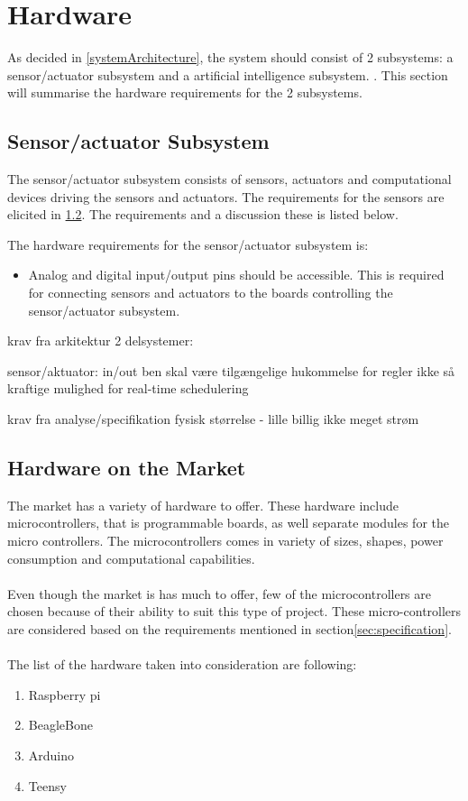 \section{Hardware}
As decided in \cref{systemArchitecture}, the system should consist of 2 subsystems: a sensor/actuator subsystem and a artificial intelligence subsystem. . This section will summarise the hardware requirements for the 2 subsystems.

\subsection{Sensor/actuator Subsystem}
The sensor/actuator subsystem consists of sensors, actuators and computational devices driving the sensors and actuators. The requirements for the sensors are elicited in \cref{}. The requirements and a discussion these is listed below.

The hardware requirements for the sensor/actuator subsystem is:

\begin{itemize}
\item Analog and digital input/output pins should be accessible. This is required for connecting sensors and actuators to the boards controlling the sensor/actuator subsystem.
\end{itemize}

krav fra arkitektur
2 delsystemer:

sensor/aktuator:
in/out ben skal være tilgængelige
hukommelse for regler
ikke så kraftige
mulighed for real-time schedulering

krav fra analyse/specifikation
fysisk størrelse - lille
billig
ikke meget strøm





\subsection{Hardware on the Market}
The market has a variety of hardware to offer. These hardware include microcontrollers, that is programmable boards, as well separate modules for the micro controllers. The microcontrollers comes in variety of sizes, shapes, power consumption and computational capabilities.
\\\\
Even though the market is has much to offer, few of the microcontrollers are chosen because of their ability to suit this type of project. These micro-controllers are  considered based on the requirements mentioned in section\ref{sec:specification}.
\\\\The list of the hardware taken into consideration are following:
\begin{enumerate}
  \item Raspberry pi
  \item BeagleBone
  \item Arduino
  \item Teensy
\end{enumerate}
